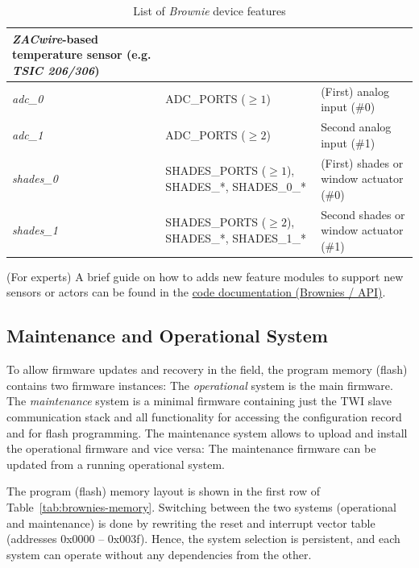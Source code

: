 \documentclass[12pt,english,parskip=half,headheight=19pt]{scrreprt}
\newcommand{\refapicgroup}[2]{\href{home2l-api_c/group__#1.html}{#2}}
\begin{document}
\begin{table}[htp]
\begin{tabular}{l|p{5cm}|p{8cm}}
        \textit{ZACwire}-based temperature sensor (e.g. \textit{TSIC 206/306}) \\
    \hline
    \textit{adc\_0} &
        ADC\_PORTS ($\geq 1$) &
        (First) analog input (\#0) \\
    \hline
    \textit{adc\_1} &
        ADC\_PORTS ($\geq 2$) &
        Second analog input (\#1) \\
    \hline
    \textit{shades\_0} &
        SHADES\_PORTS ($\geq 1$), \newline SHADES\_*, SHADES\_0\_* &
        (First) shades or window actuator (\#0) \\
    \hline
    \textit{shades\_1} &
        SHADES\_PORTS ($\geq 2$), \newline SHADES\_*, SHADES\_1\_* &
        Second shades or window actuator (\#1) \\
  \end{tabular}
  \caption[l]{List of \textit{Brownie} device features}
  \label{tab:brownies-features}
\end{table}

(For experts) A brief guide on how to adds new feature modules to support new sensors or actors can be found in the \refapicgroup{brownies__firmware}{code documentation (Brownies / API)}.



\subsection{Maintenance and Operational System}
\label{sec:brownies-firmware-maintenance}

To allow firmware updates and recovery in the field, the program memory (flash)
contains two firmware instances: The \textit{operational} system is the main firmware. The \textit{maintenance} system is a minimal firmware containing just the TWI slave communication stack and all functionality for accessing the configuration record and for flash programming. The maintenance system allows to upload and install the operational firmware and vice versa: The maintenance firmware can be updated from a running operational system.

The program (flash) memory layout is shown in the first row of Table~\ref{tab:brownies-memory}. Switching between the two systems (operational and maintenance) is done by rewriting the reset and interrupt vector table (addresses 0x0000 -- 0x003f). Hence, the system selection is persistent, and each system can operate without any dependencies from the other.
\end{document}
